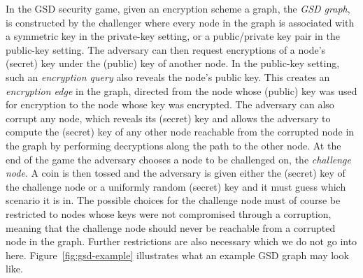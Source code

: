 In the GSD security game, given an encryption scheme a graph, the \emph{GSD graph}, is constructed by the challenger where every node in the graph is associated with a symmetric key in the private-key setting, or a public/private key pair in the public-key setting. The adversary can then request encryptions of a node's (secret) key under the (public) key of another node. In the public-key setting, such an \emph{encryption query} also reveals the node's public key. This creates an \emph{encryption edge} in the graph, directed from the node whose (public) key was used for encryption to the node whose key was encrypted. The adversary can also corrupt any node, which reveals its (secret) key and allows the adversary to compute the (secret) key of any other node reachable from the corrupted node in the graph by performing decryptions along the path to the other node. At the end of the game the adversary chooses a node to be challenged on, the \emph{challenge node}. A coin is then tossed and the adversary is given either the (secret) key of the challenge node or a uniformly random (secret) key and it must guess which scenario it is in. The possible choices for the challenge node must of course be restricted to nodes whose keys were not compromised through a corruption, meaning that the challenge node should never be reachable from a corrupted node in the graph. Further restrictions are also necessary which we do not go into here. Figure~\ref{fig:gsd-example} illustrates what an example GSD graph may look like.

